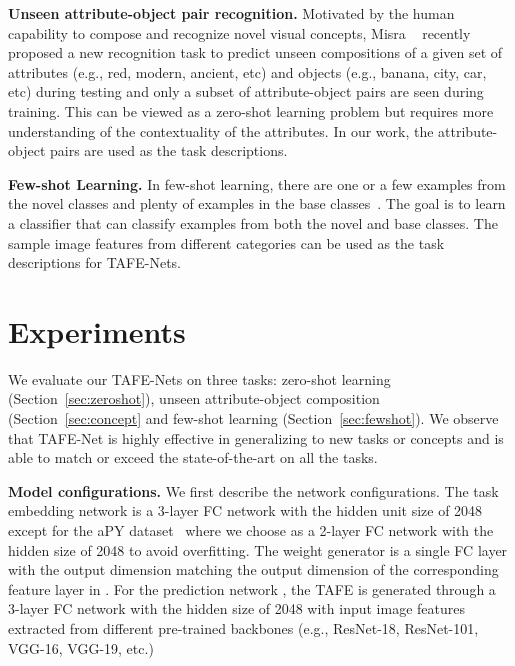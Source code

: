 \documentclass[10pt,twocolumn,letterpaper]{article}
\newcommand{\modelplural}{TAFE-Nets\xspace}
\newcommand\minisection[1]{\vspace{2mm}\noindent \textbf{#1}}
\begin{document}
\minisection{Unseen attribute-object pair recognition.} Motivated by the human capability to compose and recognize
novel visual concepts, Misra \etal~\cite{misra2017red} recently 
proposed a new recognition task to predict unseen compositions of a given set of attributes (e.g., red, modern, ancient, etc) and objects (e.g., banana, city, car, etc) during 
testing and only a subset of attribute-object pairs are seen during training. This can be viewed as a zero-shot 
learning problem but requires more understanding of the contextuality of the attributes. In our work, the 
attribute-object pairs are used as the task descriptions. 

\minisection{Few-shot Learning.} 
In few-shot learning, there are one or a few examples from the novel classes and plenty of examples in the base classes~\cite{hariharan2017low}. 
The goal is to learn a classifier that can classify examples from both the novel and base classes. The sample
image features from different categories can be used as the task descriptions for \modelplural. 





 	\newcommand{\controlmodel}{controller\xspace}
\newcommand{\controlmodelplural}{controllers\xspace}
\section{Experiments}
\label{sec:exp}
We evaluate our \modelplural on three tasks: zero-shot learning (Section~\ref{sec:zeroshot}), unseen
attribute-object composition (Section~\ref{sec:concept} and few-shot learning (Section~\ref{sec:fewshot}). We observe that TAFE-Net is highly effective in generalizing to new tasks or concepts and is able to match or exceed the state-of-the-art on all the tasks. 

\minisection{Model configurations.}
We first describe the network configurations. The task embedding network  is a 3-layer FC network with the hidden unit size of 2048 except 
for the aPY dataset~\cite{farhadi2009describing} where we choose   as a 2-layer FC network with the hidden size of 2048 to avoid overfitting. The weight generator  is a single FC layer with the output dimension matching the output dimension
of the corresponding feature layer in . For the prediction network , 
the TAFE is generated through a 3-layer FC network with the hidden size of 2048 with input image features 
extracted from different pre-trained backbones (e.g., ResNet-18, ResNet-101, VGG-16, VGG-19, etc.)
\end{document}
